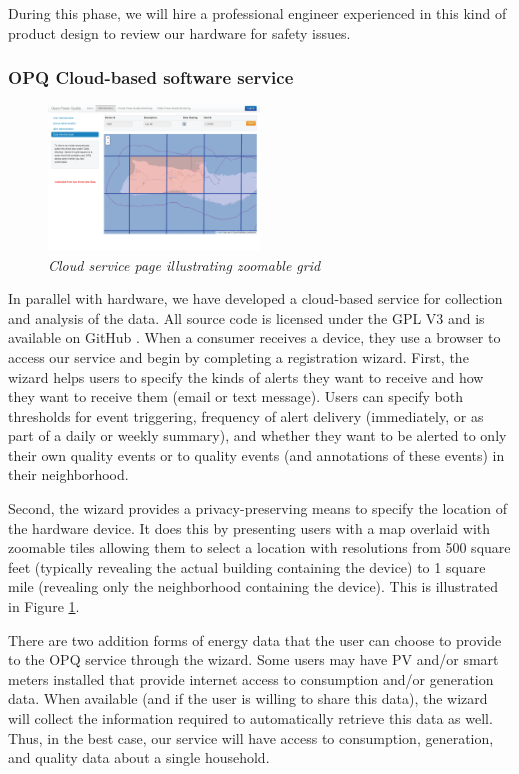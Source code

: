 \documentclass[11pt]{article}
\begin{document}
During this phase, we will hire a professional engineer experienced in this kind of product design to review our hardware for safety issues. 

\subsubsection{OPQ Cloud-based software service}

\begin{figure}
  \includegraphics[width=0.5\textwidth]{figures/cloud-grid.eps}
  \caption{\em \small Cloud service page illustrating zoomable grid}
  \label{fig:cloud-grid}
\end{figure}  

In parallel with hardware, we have developed a cloud-based service for collection and analysis of the data. All source code is licensed under the GPL V3 and is available on GitHub \cite{opq-github}.  When a consumer receives a device, they use a browser to access our service and begin by completing a registration wizard. First, the wizard helps users to specify the kinds of alerts they want to receive and how they want to receive them (email or text message).  Users can specify both thresholds for event triggering, frequency of alert delivery (immediately, or as part of a daily or weekly summary), and whether they want to be alerted to only their own quality events or to quality events (and annotations of these events) in their neighborhood.  

Second, the wizard provides a privacy-preserving means to specify the location of the hardware device. It does this by presenting users with a map overlaid with zoomable tiles allowing them to select a location with resolutions from 500 square feet (typically revealing the actual building containing the device) to 1 square mile (revealing only the neighborhood containing the device). This is illustrated in Figure \ref{fig:cloud-grid}.

There are two addition forms of energy data that the user can choose to provide to the OPQ service through the wizard.  Some users may have PV and/or smart meters installed that provide internet access to consumption and/or generation data.  When available (and if the user is willing to share this data), the wizard will collect the information required to automatically retrieve this data as well.  Thus, in the best case, our service will have access to consumption, generation, and quality data about a single household.
\end{document}

